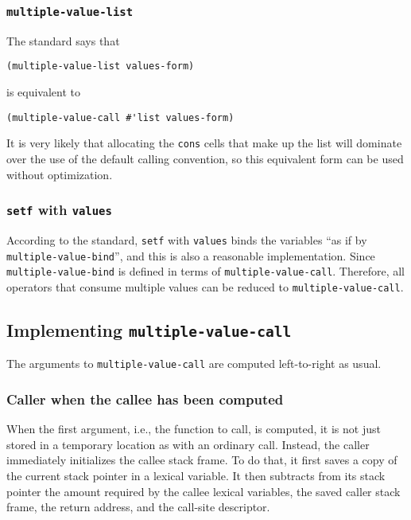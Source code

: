 \subsubsection{\texttt{multiple-value-list}}

The standard says that

\begin{verbatim}
(multiple-value-list values-form)
\end{verbatim}

is equivalent to

\begin{verbatim}
(multiple-value-call #'list values-form)
\end{verbatim}

It is very likely that allocating the \texttt{cons} cells that make up
the list will dominate over the use of the default calling convention,
so this equivalent form can be used without optimization. 

\subsubsection{\texttt{setf} with \texttt{values}}

According to the standard, \texttt{setf} with \texttt{values} binds
the variables ``as if by \texttt{multiple-value-bind}'', and this is
also a reasonable implementation.  Since \texttt{multiple-value-bind}
is defined in terms of \texttt{multiple-value-call}.  Therefore, all
operators that consume multiple values can be reduced to
\texttt{multiple-value-call}.

\subsection{Implementing \texttt{multiple-value-call}}

The arguments to \texttt{multiple-value-call} are computed
left-to-right as usual.

\subsubsection{Caller when the callee has been computed}

When the first argument, i.e., the function to call, is computed, it
is not just stored in a temporary location as with an ordinary call.
Instead, the caller immediately initializes the callee stack frame.
To do that, it first saves a copy of the current stack pointer in a
lexical variable.  It then subtracts from its stack pointer the amount
required by the callee lexical variables, the saved caller stack
frame, the return address, and the call-site descriptor.

